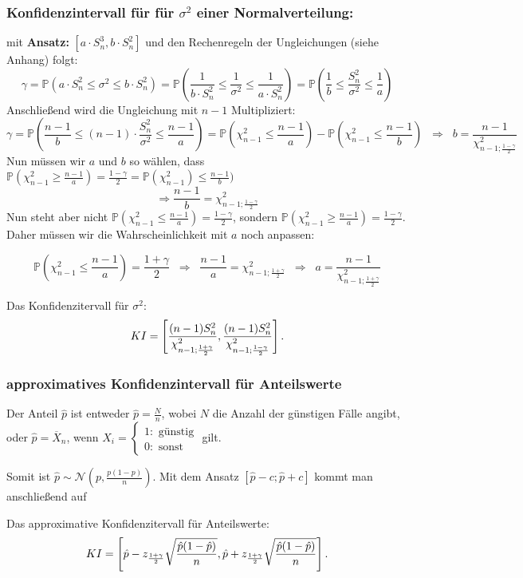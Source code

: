 \subsubsection{Konfidenzintervall für für $\sigma^2$ einer Normalverteilung:}
mit \textbf{Ansatz:} $[a\cdot S_n^3, b\cdot S_n^2]$ und den Rechenregeln der Ungleichungen (siehe Anhang) folgt:
\[\gamma=\mathbb{P}(a\cdot S_n^2\leq \sigma^2\leq b\cdot S_n^2)=
\mathbb{P}\left(\frac{1}{b\cdot S_n^2}\leq \frac{1}{\sigma^2}\leq \frac{1}{a\cdot S_n^2}\right)=
\mathbb{P}\left(\frac{1}{b}\leq \frac{S_n^2}{\sigma^2}\leq \frac{1}{a}\right)\]
Anschließend wird die Ungleichung mit $n-1$ Multipliziert:
\[\gamma=\mathbb{P}\left(\frac{n-1}{b}\leq (n-1)\cdot\frac{S_n^2}{\sigma^2}\leq \frac{n-1}{a}\right)=
\mathbb{P}\left(\chi_{n-1}^2\leq\frac{n-1}{a}\right)-\mathbb{P}\left(\chi_{n-1}^2\leq\frac{n-1}{b}\right)\;\;\Rightarrow\;\;b=\frac{n-1}{\chi^2_{n-1;\frac{1-\gamma}{2}}}\]
Nun müssen wir $a$ und $b$ so wählen, dass $\mathbb{P}(\chi^2_{n-1}\geq\frac{n-1}{a})=\frac{1-\gamma}{2}=\mathbb{P}(\chi^2_{n-1})\leq\frac{n-1}{b})$
\[\Rightarrow \frac{n-1}{b}=\chi^2_{n-1;\frac{1-\gamma}{2}}\]
Nun steht aber nicht $\mathbb{P}(\chi^2_{n-1}\leq\frac{n-1}{a})=\frac{1-\gamma}{2}$, sondern $\mathbb{P}(\chi^2_{n-1}\geq\frac{n-1}{a})=\frac{1-\gamma}{2}$. Daher müssen wir die Wahrscheinlichkeit mit $a$ noch anpassen:

\[\mathbb{P}(\chi^2_{n-1}\leq\frac{n-1}{a})=\frac{1+\gamma}{2}\;\;\Rightarrow
\;\;\frac{n-1}{a}=\chi^2_{n-1;\frac{1+\gamma}{2}}\;\;\Rightarrow
\;\;a=\frac{n-1}{\chi^2_{n-1;\frac{1+\gamma}{2}}}\]
\begin{definition}
Das Konfidenzitervall für $\sigma^2$:
\[KI=\left[{(n-1)S_n^2\over\chi^2_{n-1;{1+\gamma\over 2}}},
{(n-1)S_n^2\over\chi^2_{n-1;{1-\gamma\over 2}}}\right].\]
\end{definition}

\subsubsection{approximatives Konfidenzintervall für Anteilswerte}
Der Anteil $\hat p$ ist entweder $\hat p=\frac{N}{n}$, wobei $N$ die Anzahl der günstigen Fälle angibt, oder $\hat p=\overline X_n$, wenn $X_i=\begin{cases}1: \text{ günstig}\\0: \text{ sonst}\end{cases}$ gilt.

Somit ist $\hat p\sim \mathcal{N}(p,\frac{p(1-p)}{n})$. 
Mit dem Ansatz $[\hat p-c;\hat p+c]$ kommt man anschließend auf
\begin{definition}
Das approximative Konfidenzitervall für Anteilswerte:
\[KI=\left[\hat p-z_{1+\gamma\over 2}\sqrt{\hat p(1-\hat p)\over n},
\hat p+z_{1+\gamma\over 2}\sqrt{\hat p(1-\hat p)\over n}\right].\]
\end{definition}

